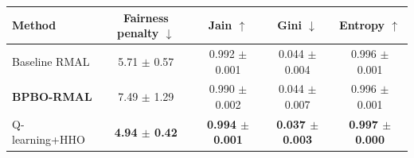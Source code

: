 \begin{tabular}{lcccc}
\hline
\textbf{Method} & \textbf{Fairness penalty $\downarrow$} & \textbf{Jain $\uparrow$} & \textbf{Gini $\downarrow$} & \textbf{Entropy $\uparrow$} \\
\hline
Baseline RMAL & 5.71 $\pm$ 0.57 & 0.992 $\pm$ 0.001 & 0.044 $\pm$ 0.004 & 0.996 $\pm$ 0.001 \\
\textbf{BPBO-RMAL} & 7.49 $\pm$ 1.29 & 0.990 $\pm$ 0.002 & 0.044 $\pm$ 0.007 & 0.996 $\pm$ 0.001 \\
Q-learning+HHO & \textbf{4.94 $\pm$ 0.42} & \textbf{0.994 $\pm$ 0.001} & \textbf{0.037 $\pm$ 0.003} & \textbf{0.997 $\pm$ 0.000} \\
\hline
\end{tabular}
